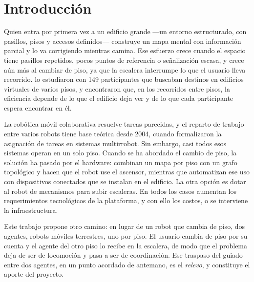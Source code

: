 \chapter*{Introducción}

Quien entra por primera vez a un edificio grande —un entorno estructurado, con
pasillos, pisos y accesos definidos— construye un mapa mental con
información parcial y lo va corrigiendo mientras camina. Ese esfuerzo crece cuando el
espacio tiene pasillos repetidos, pocos puntos de referencia o señalización escasa, y
crece aún más al cambiar de piso, ya que la escalera interrumpe lo que el usuario lleva
recorrido. \textcite{gathmorad2024strategic} lo estudiaron con 149 participantes que
buscaban destinos en edificios virtuales de varios pisos, y encontraron que, en los
recorridos entre pisos, la eficiencia depende de lo que el edificio deja ver y de lo
que cada participante espera encontrar en él.

La robótica móvil colaborativa resuelve tareas parecidas, y el reparto
de trabajo entre varios robots tiene base teórica desde 2004, cuando
\textcite{gerkey2004taxonomy} formalizaron la asignación de tareas en sistemas
multirrobot. Sin embargo, casi todos esos sistemas operan en un solo piso. Cuando se
ha abordado el cambio de piso, la solución ha pasado por el hardware:
\textcite{kim2024indoor} combinan un mapa por piso con un grafo topológico y hacen que
el robot use el ascensor, mientras que \textcite{song2024elevator} automatizan ese uso
con dispositivos conectados que se instalan en el edificio. La otra opción es dotar al
robot de mecanismos para subir escaleras. En todos los casos aumentan los requerimientos
tecnológicos de la plataforma, y con ello los costos, o se interviene la infraestructura.

Este trabajo propone otro camino: en lugar de un robot que cambia de piso, dos
agentes, robots móviles terrestres, uno por piso. El usuario cambia de piso por su
cuenta y el agente del otro piso lo recibe en la escalera, de modo que el problema deja
de ser de locomoción y pasa a ser de coordinación. Ese traspaso del guiado entre dos
agentes, en un punto acordado de antemano, es el \emph{relevo}, y constituye el aporte
del proyecto.

